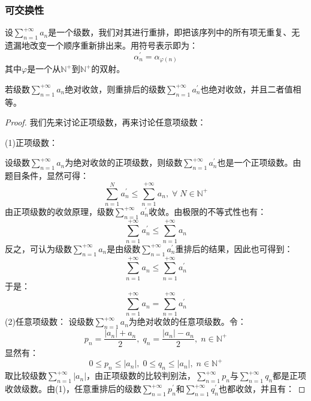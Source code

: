 \subsubsection{可交换性}
设$\sum\limits_{n=1}^{+\infty}a_n$是一个级数，我们对其进行重排，即把该序列中的所有项无重复、无遗漏地改变一个顺序重新排出来。用符号表示即为：
\begin{equation*}
	\alpha^{'}_n=\alpha_{\varphi(n)}
\end{equation*}
其中$\varphi$是一个从$\mathbb{N}^+$到$\mathbb{N}^+$的双射。
\begin{theorem}
	若级数$\sum\limits_{n=1}^{+\infty}a_n$绝对收敛，则重排后的级数$\sum\limits_{n=1}^{+\infty}a^{'}_n$也绝对收敛，并且二者值相等。
\end{theorem}
\begin{proof}
	我们先来讨论正项级数，再来讨论任意项级数：\par
	(1)正项级数：\par
	设级数$\sum\limits_{n=1}^{+\infty}a_n$为绝对收敛的正项级数，则级数$\sum\limits_{n=1}^{+\infty}a^{'}_n$也是一个正项级数。由题目条件，显然可得：
	\begin{equation*}
		\sum_{n=1}^Na^{'}_n\leqslant\sum_{n=1}^{+\infty}a_n,\;\forall\;N\in\mathbb{N}^+
	\end{equation*}
	由正项级数的收敛原理，级数$\sum\limits_{n=1}^{+\infty}a^{'}_n$收敛。由极限的不等式性也有：
	\begin{equation*}
		\sum_{n=1}^{+\infty}a^{'}_n\leqslant\sum_{n=1}^{+\infty}a_n
	\end{equation*}
	反之，可认为级数$\sum\limits_{n=1}^{+\infty}a_n$是由级数$\sum\limits_{n=1}^{+\infty}a^{'}_n$重排后的结果，因此也可得到：
	\begin{equation*}
		\sum_{n=1}^{+\infty}a_n\leqslant\sum_{n=1}^{+\infty}a^{'}_n
	\end{equation*}
	于是：
	\begin{equation*}
		\sum_{n=1}^{+\infty}a_n=\sum_{n=1}^{+\infty}a^{'}_n
	\end{equation*}
	(2)任意项级数：
	设级数$\sum\limits_{n=1}^{+\infty}a_n$为绝对收敛的任意项级数。令：
	\begin{equation*}
		p_n=\frac{|a_n|+a_n}{2},\;q_n=\frac{|a_n|-a_n}{2},\;n\in\mathbb{N}^+
	\end{equation*}
	显然有：
	\begin{equation*}
		0\leqslant p_n\leqslant|a_n|,\;0\leqslant q_n\leqslant|a_n|,\;n\in\mathbb{N}^+
	\end{equation*}
	取比较级数$\sum\limits_{n=1}^{+\infty}|a_n|$，由正项级数的比较判别法，$\sum\limits_{n=1}^{+\infty}p_n$与$\sum\limits_{n=1}^{+\infty}q_n$都是正项收敛级数。由(1)，任意重排后的级数$\sum\limits_{n=1}^{+\infty}p^{'}_n$和$\sum\limits_{n=1}^{+\infty}q^{'}_n$也都收敛，并且有：

\end{proof}
